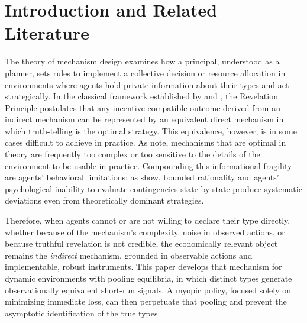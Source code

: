 \documentclass[review,authoryear,12pt]{elsarticle}
\theoremstyle{plain}
\theoremstyle{definition}
\newcommand{\1}{\mathbf{1}}
\begin{document}
\section{Introduction and Related Literature}\label{sec:intro}

The theory of mechanism design examines how a principal, understood as a planner, sets rules to implement a collective decision or resource allocation in environments where agents hold private information about their types and act strategically. In the classical framework established by \citet{Gibbard1973} and \citet{Myerson1979IC,Myerson1981}, the Revelation Principle postulates that any incentive-compatible outcome derived from an indirect mechanism can be represented by an equivalent direct mechanism in which truth-telling is the optimal strategy. This equivalence, however, is in some cases difficult to achieve in practice. As \citet{BergemannMorris2012} note, mechanisms that are optimal in theory are frequently too complex or too sensitive to the details of the environment to be usable in practice. Compounding this informational fragility are agents' behavioral limitations; as \citet{ZhangLevin2017} show, bounded rationality and agents' psychological inability to evaluate contingencies state by state produce systematic deviations even from theoretically dominant strategies.

Therefore, when agents cannot or are not willing to declare their type directly, whether because of the mechanism's complexity, noise in observed actions, or because truthful revelation is not credible, the economically relevant object remains the \emph{indirect} mechanism, grounded in observable actions and implementable, robust instruments. This paper develops that mechanism for dynamic environments with pooling equilibria, in which distinct types generate observationally equivalent short-run signals. A myopic policy, focused solely on minimizing immediate loss, can then perpetuate that pooling and prevent the asymptotic identification of the true types.
\end{document}
